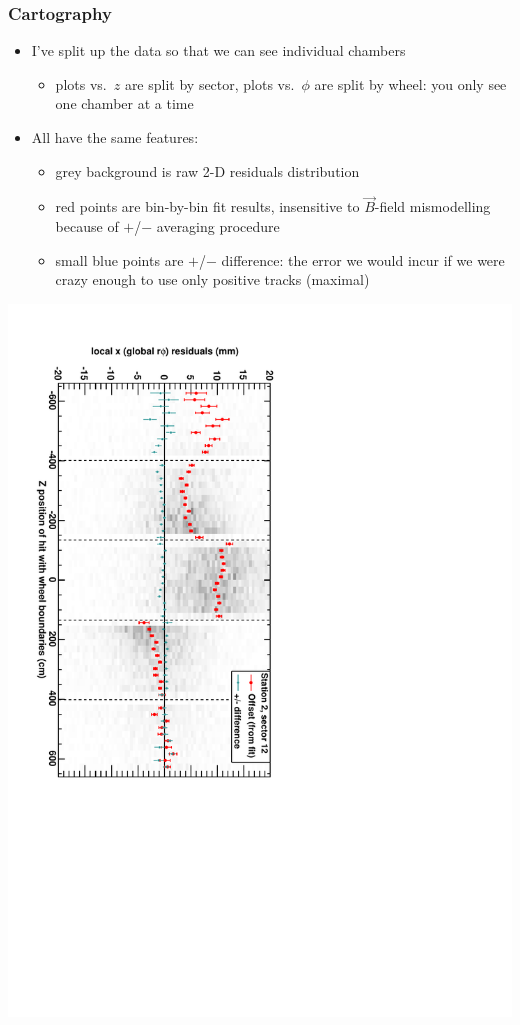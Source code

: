 \documentclass[compress]{beamer}
\begin{document}

\begin{frame}
\frametitle{Cartography}
\begin{itemize}
\item I've split up the data so that we can see individual chambers
\begin{itemize}
\item plots vs.\ $z$ are split by sector, plots vs.\ $\phi$ are split
  by wheel: you only see one chamber at a time
\end{itemize}
\item All have the same features:
\begin{itemize}
\item grey background is raw 2-D residuals distribution
\item red points are bin-by-bin fit results, insensitive to
  $\vec{B}$-field mismodelling because of $+$/$-$ averaging procedure
\item small blue points are $+$/$-$ difference: the error we would
  incur if we were crazy enough to use only positive tracks (maximal)
\end{itemize}
\end{itemize}

\vspace{-0.4 cm}
\begin{center}
\includegraphics[height=0.75\linewidth, angle=90]{DTrphiVsZ_st2_sr12.pdf}
\end{center}
\end{frame}
\end{document}
